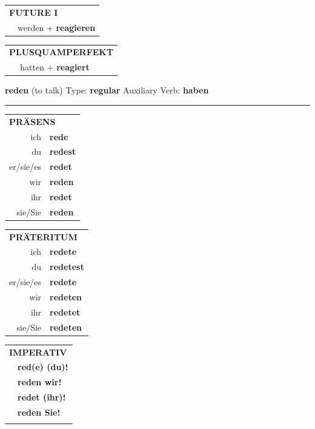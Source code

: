 \documentclass[10pt,a4paper]{revtex4-2}
\begin{document}
\begin{verbbox-acc}
\begin{tabular}{rl}
    \multicolumn{2}{l}{\textbf{FUTURE I} }\\
  &  werden + \textbf{reagieren}\\
 
  \end{tabular}
\hfill
   \begin{tabular}{rl}
      \multicolumn{2}{l}{\textbf{PLUSQUAMPERFEKT}}\\
  &  hatten + \textbf{reagiert}\\
  \end{tabular}
  
  \vspace{-5pt}


\end{verbbox-acc}
\begin{verbbox}
    {\Large \bf reden} (to talk) \hfill Type: \textbf{regular} \hfill Auxiliary Verb: \textbf{haben} 
    
     \vspace{5pt}

    \hrule
    
    \vspace{5pt}

  \begin{tabular}{rl}
     \multicolumn{2}{l}{\textbf{PRÄSENS} }\\
    ich & \textbf{rede}\\
    du & \textbf{redest}\\
    er/sie/es & \textbf{redet}\\
    wir & \textbf{reden}\\
    ihr & \textbf{redet}\\
    sie/Sie & \textbf{reden}\\
  \end{tabular}
  \hfill
     \begin{tabular}{rl}
    \multicolumn{2}{l}{\textbf{PRÄTERITUM} }\\
    ich & \textbf{redete}\\
    du & \textbf{redetest}\\
    er/sie/es & \textbf{redete}\\
    wir & \textbf{redeten}\\
    ihr & \textbf{redetet}\\
    sie/Sie & \textbf{redeten}\\
  \end{tabular}
  \hfill
  \begin{tabular}{rl}
     \multicolumn{2}{l}{\textbf{IMPERATIV} }\\
   & \textbf{red(e) (du)!}\\
   & \textbf{reden wir!}\\
   & \textbf{redet (ihr)!}\\
   & \textbf{reden Sie!}\\
   & \vspace{10pt}
  \end{tabular}


\end{verbbox}
\end{document}
